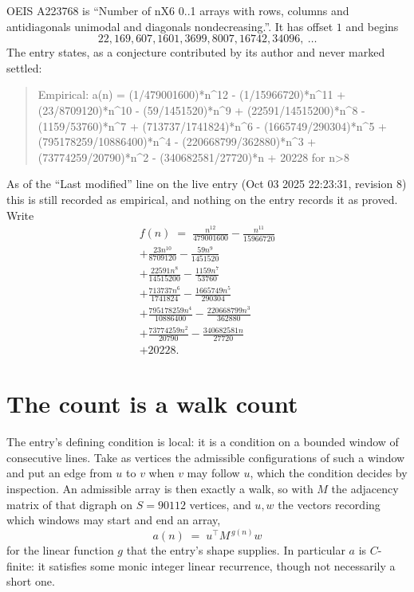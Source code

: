 \documentclass[11pt,a4paper]{article}
\theoremstyle{plain}
\theoremstyle{definition}
\begin{document}
OEIS A223768 is ``Number of nX6 0..1 arrays with rows, columns and antidiagonals unimodal and diagonals nondecreasing.''. It has offset $1$ and begins
\[
22, 169, 607, 1601, 3699, 8007, 16742, 34096,\ \dots
\]
The entry states, as a conjecture contributed by its author and never marked settled:
\begin{quote}
Empirical: a(n) = (1/479001600)*n\^{}12 - (1/15966720)*n\^{}11 + (23/8709120)*n\^{}10 - (59/1451520)*n\^{}9 + (22591/14515200)*n\^{}8 - (1159/53760)*n\^{}7 + (713737/1741824)*n\^{}6 - (1665749/290304)*n\^{}5 + (795178259/10886400)*n\^{}4 - (220668799/362880)*n\^{}3 + (73774259/20790)*n\^{}2 - (340682581/27720)*n + 20228 for n>8
\end{quote}
As of the ``Last modified'' line on the live entry (Oct 03 2025 22:23:31, revision 8) this is still
recorded as empirical, and nothing on the entry records it as proved. Write
\begin{multline*}
f(n)\;=\;\frac{n^{12}}{479001600} - \frac{n^{11}}{15966720} \\
+ \frac{23 n^{10}}{8709120} - \frac{59 n^{9}}{1451520} \\
+ \frac{22591 n^{8}}{14515200} - \frac{1159 n^{7}}{53760} \\
+ \frac{713737 n^{6}}{1741824} - \frac{1665749 n^{5}}{290304} \\
+ \frac{795178259 n^{4}}{10886400} - \frac{220668799 n^{3}}{362880} \\
+ \frac{73774259 n^{2}}{20790} - \frac{340682581 n}{27720} \\
+ 20228.
\end{multline*}

\section{The count is a walk count}

The entry's defining condition is local: it is a condition on a bounded window of consecutive lines. Take as vertices the
admissible configurations of such a window and put an edge from $u$ to $v$ when $v$ may
follow $u$, which the condition decides by inspection. An admissible array is then exactly a
walk, so with $M$ the adjacency matrix of that digraph on $S=90112$ vertices, and $u,w$ the
vectors recording which windows may start and end an array,
\[
a(n)\;=\;u^{\!\top}M^{\,g(n)}w
\]
for the linear function $g$ that the entry's shape supplies. In particular $a$ is
$C$-finite: it satisfies some monic integer linear recurrence, though not necessarily a short
one.
\end{document}
